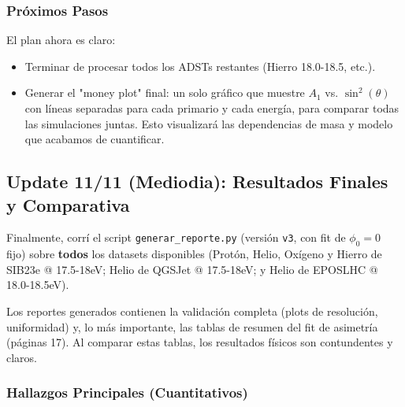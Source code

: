 \subsubsection*{Próximos Pasos}
El plan ahora es claro:
\begin{itemize}
	\item Terminar de procesar todos los ADSTs restantes (Hierro 18.0-18.5, etc.).
	\item Generar el "money plot" final: un solo gráfico que muestre $A_1$ vs. $\sin^2(\theta)$ con líneas separadas para cada primario y cada energía, para comparar todas las simulaciones juntas. Esto visualizará las dependencias de masa y modelo que acabamos de cuantificar.
\end{itemize}

\subsection*{Update 11/11 (Mediodia): Resultados Finales y Comparativa}

Finalmente, corrí el script \lstinline|generar_reporte.py| (versión \lstinline|v3|, con fit de $\phi_0=0$ fijo) sobre \textbf{todos} los datasets disponibles (Protón, Helio, Oxígeno y Hierro de SIB23e @ 17.5-18eV; Helio de QGSJet @ 17.5-18eV; y Helio de EPOSLHC @ 18.0-18.5eV).

Los reportes generados contienen la validación completa (plots de resolución, uniformidad) y, lo más importante, las tablas de resumen del fit de asimetría (páginas 17). Al comparar estas tablas, los resultados físicos son contundentes y claros.

\subsubsection*{Hallazgos Principales (Cuantitativos)}

